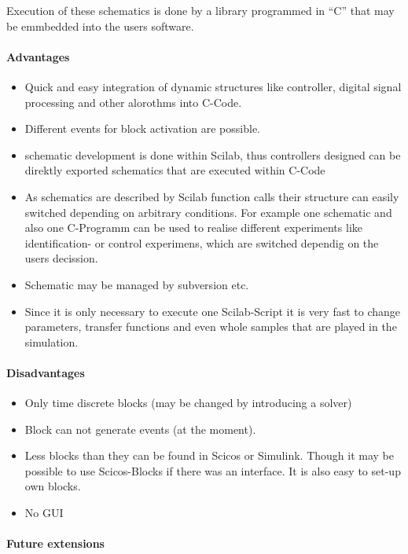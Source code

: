 \documentclass[%
	pdftex,%
	a4paper,%
	oneside,%
	11pt,%
	halfparskip,%
	headsepline,%
	bibtotocnumbered,%
	idxtotoc%
]{scrartcl}
\begin{document}
Execution of these schematics is done by a library programmed in ``C'' that may be emmbedded into the users software.

\paragraph{Advantages}

\begin{itemize}
 \item Quick and easy integration of dynamic structures like controller, digital signal processing and other alorothms into C-Code.
 \item Different events for block activation are possible.
 \item schematic development is done within Scilab, thus controllers designed can be direktly exported schematics that are executed within C-Code
 \item As schematics are described by Scilab function calls their structure can easily switched depending on arbitrary conditions. For example one schematic and also one C-Programm can be used to realise different experiments like identification- or control experimens, which are switched dependig on the users decission.
 \item Schematic may be managed by subversion etc.
 \item Since it is only necessary to execute one Scilab-Script it is very fast to change parameters, transfer functions and even whole samples that are played in the simulation.
\end{itemize}

\paragraph{Disadvantages}

\begin{itemize}
 \item Only time discrete blocks (may be changed by introducing a solver)
 \item Block can not generate events (at the moment).
 \item Less blocks than they can be found in Scicos or Simulink. Though it may be possible to use Scicos-Blocks if there was an interface. It is also easy to set-up own blocks.
 \item No GUI
\end{itemize}

\paragraph{Future extensions}
\end{document}
